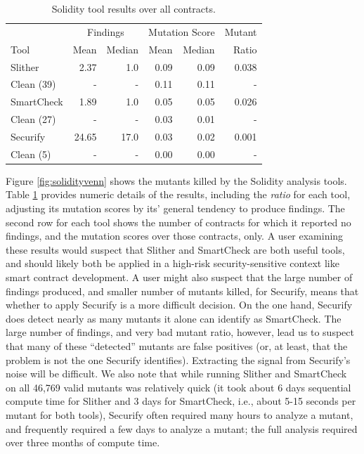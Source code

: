 \begin{table}
  \begin{tabular}{l|r|r|r|r|r}
    & \multicolumn{2}{|c|}{Findings} & \multicolumn{2}{|c|}{Mutation Score}  & Mutant \\
    Tool & Mean & Median & Mean & Median & Ratio\\
    \hline
    \hline
    Slither & 2.37 & 1.0 & 0.09 & 0.09 & 0.038 \\
    Clean (39) & - & - & 0.11 & 0.11 & -\\
    \hline
    SmartCheck & 1.89 & 1.0 & 0.05 & 0.05 & 0.026 \\
    Clean (27) & - & - & 0.03 & 0.01 & - \\
    \hline
    Securify & 24.65 & 17.0 & 0.03 & 0.02 &  0.001 \\
    Clean (5) & - & - & 0.00 & 0.00 & - \\
    \hline
    
  \end{tabular}
  \caption{Solidity tool results over all contracts.}
  \label{tab:scoresolidity}
\end{table}


Figure \ref{fig:solidityvenn} shows the mutants killed by the Solidity analysis tools.  Table \ref{tab:scoresolidity} provides numeric details of the results, including the \emph{ratio} for each tool, adjusting its mutation scores by its' general tendency to produce findings.  The second row for each tool shows the number of contracts for which it reported no findings, and the mutation scores over those contracts, only. A user examining these results would suspect that Slither and SmartCheck are both useful tools, and should likely both be applied in a high-risk security-sensitive context like smart contract development.  A user might also suspect that the large number of findings produced, and smaller number of mutants killed, for Securify, means that whether to apply Securify is a more difficult decision.  On the one hand, Securify does detect nearly as many mutants it alone can identify as SmartCheck.  The large number of findings, and very bad mutant ratio, however, lead us to suspect that many of these ``detected'' mutants are false positives (or, at least, that the problem is not the one Securify identifies).  Extracting the signal from Securify's noise will be difficult.  We also note that while running Slither and SmartCheck on all 46,769 valid mutants was relatively quick (it took about 6 days sequential compute time for Slither and 3 days for SmartCheck, i.e., about 5-15 seconds per mutant for both tools), Securify often required many hours to analyze a mutant, and frequently required a few days to analyze a mutant; the full analysis required over three months of compute time.

